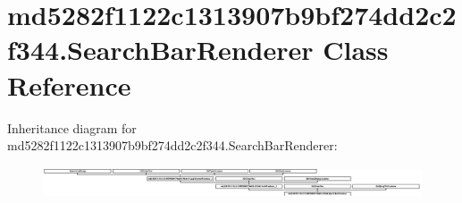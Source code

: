 \hypertarget{classmd5282f1122c1313907b9bf274dd2c2f344_1_1SearchBarRenderer}{}\section{md5282f1122c1313907b9bf274dd2c2f344.\+Search\+Bar\+Renderer Class Reference}
\label{classmd5282f1122c1313907b9bf274dd2c2f344_1_1SearchBarRenderer}
Inheritance diagram for md5282f1122c1313907b9bf274dd2c2f344.\+Search\+Bar\+Renderer\+:\begin{figure}[H]
\begin{center}
\leavevmode
\includegraphics[height=0.915033cm]{classmd5282f1122c1313907b9bf274dd2c2f344_1_1SearchBarRenderer}
\end{center}
\end{figure}

